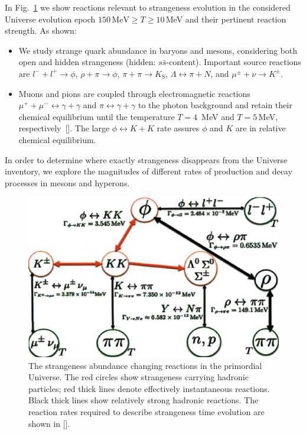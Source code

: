 In Fig.~\ref{Strangeness_map2} we show reactions relevant to strangeness evolution in the considered Universe evolution epoch $150\,\mathrm{MeV}\ge T\ge 10$\,MeV  and their pertinent reaction strength. As shown:
\begin{itemize}
\item
We study strange quark abundance in baryons and mesons, considering both open and hidden strangeness (hidden: $s\bar s$-content). Important source reactions are $l^-+l^+\rightarrow\phi$, $\rho+\pi\rightarrow\phi$, $\pi+\pi\rightarrow K_\mathrm{S}$, $\Lambda \leftrightarrow \pi+ N$, and $\mu^\pm+\nu\rightarrow K^\pm$. 
\item
Muons and pions are coupled through electromagnetic reactions $\mu^++\mu^-\leftrightarrow\gamma+\gamma$ and $\pi\leftrightarrow\gamma+\gamma$ to the photon background and retain their chemical equilibrium until the temperature $T =4$\, MeV and $T=5$\,MeV, respectively~[\cite{Rafelski:2021aey,Kuznetsova:2008jt}]. The large $\phi\leftrightarrow K+K$ rate assures $\phi$ and $K$ are in relative chemical equilibrium.
\end{itemize}
In order to determine where exactly strangeness disappears from the Universe inventory, we explore the magnitudes of different rates of production and decay processes in mesons and hyperons.
\begin{figure} %
\centering
\includegraphics[width=0.75\linewidth]{./plots/Strangeness002_newJ.jpg}
\caption{
The strangeness abundance changing reactions in the primordial Universe. The red circles show strangeness carrying hadronic particles; red thick lines denote effectively instantaneous reactions. Black thick lines show relatively strong hadronic reactions. The reaction rates required to describe  strangeness time evolution are shown in [\cite{Rafelski:2020ajx}].
}
\label{Strangeness_map2}
\end{figure}



